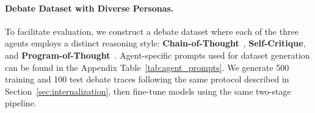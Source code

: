\documentclass[11pt]{article}
\begin{document}
\paragraph{Debate Dataset with Diverse Personas.}
To facilitate evaluation, we construct a debate dataset where each of the three agents employs a distinct reasoning style: \textbf{Chain-of-Thought}~\cite{Wei2022Chain}, \textbf{Self-Critique}, and \textbf{Program-of-Thought}~\cite{chen2022program}.
Agent-specific prompts used for dataset generation can be found in the Appendix Table~\ref{tab:agent_prompts}.
We generate 500 training and 100 test debate traces following the same protocol described in Section~\ref{sec:internalization}, then fine-tune models using the same two-stage pipeline.
\end{document}
